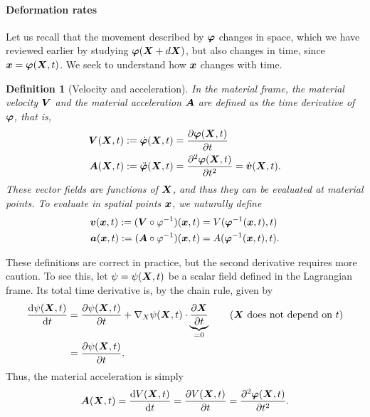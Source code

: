 \documentclass{article}
\renewcommand{\vec}{\vectorsym}
\newtheorem{definition}{Definition}
\newcommand{\vX}{\nabla_X}
\newcommand{\vvarphi}{\vec{\varphi}}
\begin{document}
\paragraph{Deformation rates} Let us recall that the movement described by $\vvarphi$ changes in space, which we have reviewed earlier by studying $\vvarphi(\vec X + d\vec X)$, but also changes in time, since $\vec x =\vvarphi(\vec X, t)$. We seek to understand how $\vec x$ changes with time. 
\begin{definition}[Velocity and acceleration]
    In the material frame, the material velocity $\vec V$ and the material acceleration $\vec A$ are defined as the time derivative of $\vvarphi$, that is, 
    \begin{align*}
        \vec V(\vec X, t) := \dot{\vvarphi}(\vec X, t) &= \frac{\partial \vvarphi(\vec X, t)}{\partial t}\\
        \vec A(\vec X, t) := \ddot{\vvarphi}(\vec X, t) &= \frac{\partial^2 \vvarphi(\vec X, t)}{\partial t^2} = \dot{\vec v}(\vec X, t).
    \end{align*}
    These vector fields are functions of $\vec X$, and thus they can be evaluated at material points. To evaluate in spatial points $\vec x$, we naturally define
    \begin{align*}
        \vec v(\vec x, t) := (\vec V \circ \varphi^{-1})(\vec x, t) &= V(\vvarphi^{-1}(\vec x, t), t)\\
        \vec a(\vec x, t) := (\vec A \circ \varphi^{-1})(\vec x, t) &= A(\vvarphi^{-1}(\vec x, t), t).
    \end{align*}
\end{definition}
These definitions are correct in practice, but the second derivative requires more caution. To see this, let $\psi=\psi(\vec X,t)$ be a scalar field defined in the Lagrangian frame. Its total time derivative is, by the chain rule, given by
\begin{align*}
    \frac{\mathrm{d}\psi(\vec X, t)}{\mathrm{d}t} &= \frac{\partial\psi(\vec X, t)}{\partial t } + \vX \psi(\vec X, t)\cdot \underbrace{\frac{\partial\vec X}{\partial t}}_{=0} \tag{$\vec X$ does not depend on $t$}\\
    &= \frac{\partial\psi(\vec X, t)}{\partial t }.
\end{align*}
Thus, the material acceleration is simply 
\begin{equation*}
    \vec A(\vec X, t) = \frac{\mathrm{d}V(\vec X, t)}{\mathrm{d}t} = \frac{\partial V(\vec X, t)}{\partial t} = \frac{\partial^2 \vvarphi(\vec X, t)}{\partial t^2}.
\end{equation*}
\end{document}
